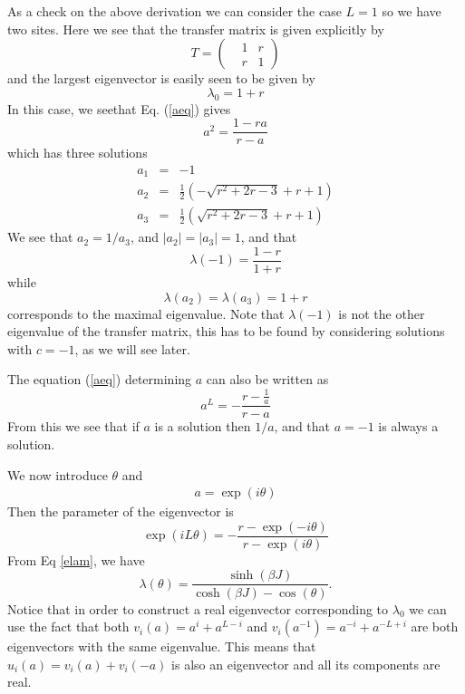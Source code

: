 As a check on the above derivation we can consider the case $L=1$ so we have two sites. Here we see that the transfer matrix is given explicitly by
\begin{equation}
T =\begin{pmatrix} & 1 & r\\& r &1\end{pmatrix}
\end{equation}
and the largest eigenvector is easily seen to be given by
\begin{equation}
\lambda_0 = 1+r 
\end{equation}
In this case, we seethat Eq. (\ref{aeq}) gives
\begin{equation}
a^{2} = \frac{1-ra}{r-a}
\end{equation}
which has three solutions
\begin{eqnarray}
a_1&=& -1\\
a_2&=& \frac{1}{2} \left(-\sqrt{r^2+2
r-3}+r+1\right) \\
a_3&=& \frac{1}{2} \left(\sqrt{r^2+2
r-3}+r+1\right)\end{eqnarray}
We see that $a_2=1/a_3$, and $|a_2|=|a_3|=1$, and that
\begin{equation}
\lambda(-1)= \frac{1-r}{1+r}
\end{equation}
while 
\begin{equation}
\lambda(a_2)=\lambda(a_3)= 1+r
\end{equation}
corresponds to the maximal eigenvalue. Note that $\lambda(-1)$ is not the other eigenvalue of the transfer matrix, this has to be found by considering solutions with $c=-1$, as we will see later.

The equation (\ref{aeq}) determining $a$ can also be written as
\begin{equation}
a^{L} = - \frac{r-\frac{1}{a}}{r-a}
\end{equation}
From this we see that if $a$ is a solution then $1/a$, and that $a=-1$ is always a solution.


We now introduce $\theta$ and 
\begin{align}
a=\exp(i\theta)
\label{def-theta}
\end{align}
Then the parameter of the eigenvector is
\begin{equation}
\exp(i L \theta) = - \frac{r-\exp(-i\theta)}{r-\exp(i\theta)}
\label{thetamas}
\end{equation}
From Eq \eqref{elam}, we have
\begin{equation}
\lambda(\theta) = \frac{\sinh(\beta J)}{\cosh(\beta J) - \cos(\theta)}.
\end{equation}
Notice that in order to construct a real eigenvector corresponding to $\lambda_0$ we can use the fact that both $v_i(a) = a^i + a^{L-i}$ and $v_i(a^{-1}) = a^{-i} + a^{-L+i}$ are both eigenvectors with the same eigenvalue. This means that $u_i(a) = v_i(a) + v_i(-a)$ is also an eigenvector and all its components are real. 

